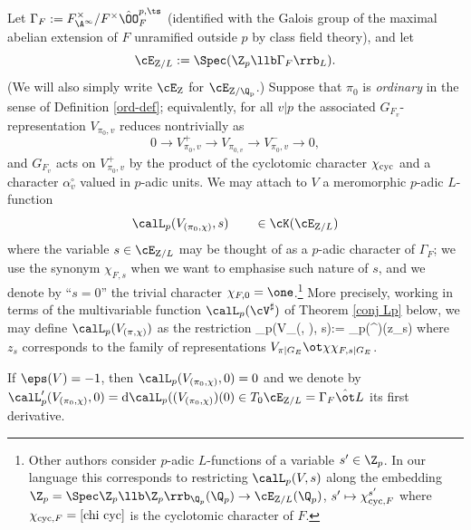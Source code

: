 Let $\Gamma_{F}:= F_{\A^{\infty}}^{\times}/F^{\times}\hat{\OO}^{p, \ts}_{F}$ (identified with the Galois group of the maximal abelian  extension of $F$ unramified outside $p$ by class field theory), and  let
$$\cE_{{\rm Z}/L}:=\Spec(\Z_{p}\llb \Gamma_{F}\rrb_{L}).$$
(We will also simply write $\cE_{\rm Z}$ for $\cE_{\rm Z/\Q_{p}}$.)
 Suppose that $ \pi_{0}$ is \emph{ordinary}  in the sense of Definition \ref{ord-def}; equivalently, for all $v\vert p$ the associated $G_{F_{v}}$-representation $V_{\pi_{0}, v}$ reduces nontrivially as
$$0\to V_{\pi_{0}, v}^{+}\to V_{\pi_{0, v}}\to V_{\pi_{0}, v}^{-}\to 0,$$
and $G_{F_{v}}$ acts on $V_{\pi_{0},v}^{+}$ by the product of the cyclotomic character $\chi_{\rm cyc}$ and a character $\alpha_{v}^{\circ}$ valued in $p$-adic units.
We may attach to $V$ a meromorphic $p$-adic $L$-function
$$  \calL_{p}(V_{(\pi_{0}, \chi)}, s) \qquad \in \cK(\cE_{{\rm Z}/L})$$
where the variable  $s\in \cE_{{\rm Z}/L}$ may be thought of as a $p$-adic character of $\Gamma_{F}$; we use the synonym  $\chi_{F, s}$ when we want to emphasise such nature of $s$, and we denote by ``$s=0$'' the trivial character $\chi_{F, 0}=\one$.\footnote{Other authors consider $p$-adic $L$-functions of a variable $s'\in\Z_{p}$. In our language this corresponds to restricting $\calL_{p}(V, s)$ along the embedding $\Z_{p}=\Spec \Z_{p}\llb \Z_{p}\rrb_{\Q_{p}}(\Q_{p})\to \cE_{{\rm Z}/L}(\Q_{p})$,  $s'\mapsto \chi_{{\rm cyc}, F}^{s'}$ where $\chi_{{\rm cyc}, F}=\eqref{chi cyc}$ is the cyclotomic character of $F$.}
More precisely, working in terms of the multivariable  function $\calL_{p}(\cV^{\sharp})$ of Theorem \ref{conj Lp} below,   we may define  $\calL_{p}(V_{(\pi, \chi)})$ as the restriction
 \beq {}
 \calL_{p}(V_{(\pi, \chi)}, s):= \calL_{p}(\cV^{\sharp})(z_{s})
 \eeq
  where  $z_{s}$ corresponds to the family of representations $V_{\pi|G_{E}}\ot\chi \chi_{F, s|G_{E}}$.

  If $\eps(V)=-1$, then $\calL_{p}(V_{(\pi_{0}, \chi)}, 0)=0 $ and we denote  by $\calL_{p}'(V_{(\pi_{0}, \chi)}, 0)={\rm d}\calL_{p}((V_{(\pi_{0}, \chi)})(0) \in T_{0}\cE_{{\rm Z}/L}= \Gamma_{F}\hat{\ot}L$  its first derivative.





